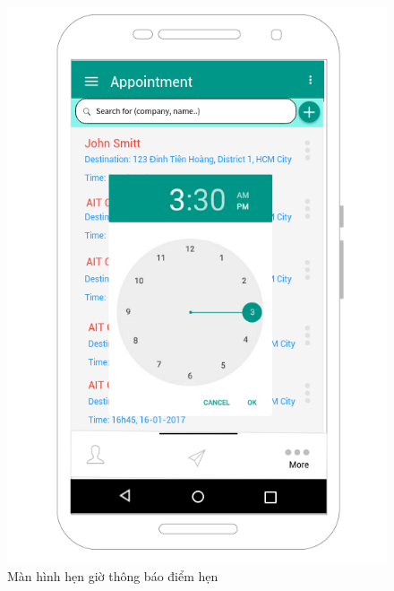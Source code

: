 \documentclass[a4paper]{article}
\begin{document}
\begin{figure}[h]
    \includegraphics[scale=0.6]{Mockup/AP_picktimeappointment}
    \centering
    \caption{Màn hình hẹn giờ thông báo điểm hẹn}
    \label{fig:AP_picktimeappointment}
\end{figure}
\end{document}
